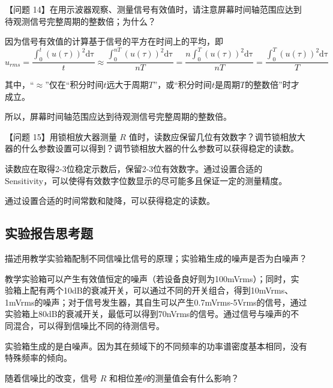 \documentclass[dvipsnames, svgnames,a4paper,11pt]{article}
\begin{document}
		\vspace{0.05\textwidth} %


		【问题 14】在用示波器观察、测量信号有效值时，请注意屏幕时间轴范围应达到待观测信号完整周期的整数倍；为什么？

		因为信号有效值的计算基于信号的平方在时间上的平均，即
		\[
			u_{rms} = \frac{\int_0^{t} (u(\tau))^2 \mathrm{d\tau}}{t} \approx \frac{\int_0^{nT} (u(\tau))^2 \mathrm{d\tau}}{nT} = \frac{n\int_0^{T} (u(\tau))^2 \mathrm{d\tau}}{nT} = \frac{\int_0^{T} (u(\tau))^2 \mathrm{d\tau}}{T}
		\]

		其中，“$\approx$”仅在“积分时间$t$远大于周期$T$”，或“积分时间$t$是周期$T$的整数倍”时才成立。

		所以，屏幕时间轴范围应达到待观测信号完整周期的整数倍。


		\vspace{0.05\textwidth} %


		【问题 15】用锁相放大器测量 $R$ 值时，读数应保留几位有效数字？调节锁相放大器的什么参数设置可以得到？调节锁相放大器的什么参数可以获得稳定的读数。

		读数应在取得2-3位稳定示数后，保留2-3位有效数字。通过设置合适的Sensitivity，可以使得有效数字位数显示的尽可能多且保证一定的测量精度。

		通过设置合适的时间常数和陡降，可以获得稳定的读数。




\subsection{实验报告思考题}


\begin{question}
	描述用教学实验箱配制不同信噪比信号的原理；实验箱生成的噪声是否为白噪声？
\end{question}

	教学实验箱可以产生有效值恒定的噪声（若设备良好则为100mVrms）；同时，实验箱上配有两个10dB的衰减开关，可以通过不同的开关组合，得到10mVrms、1mVrms的噪声；对于信号发生器，其自生可以产生0.7mVrms-5Vrms的信号，通过实验箱上80dB的衰减开关，最低可以得到70nVrms的信号。通过信号与噪声的不同混合，可以得到信噪比不同的待测信号。

	实验箱生成的是白噪声。因为其在频域下的不同频率的功率谱密度基本相同，没有特殊频率的倾向。






\begin{question}
	随着信噪比的改变，信号 $R$ 和相位差$\theta$的测量值会有什么影响？
\end{question}
\end{document}
